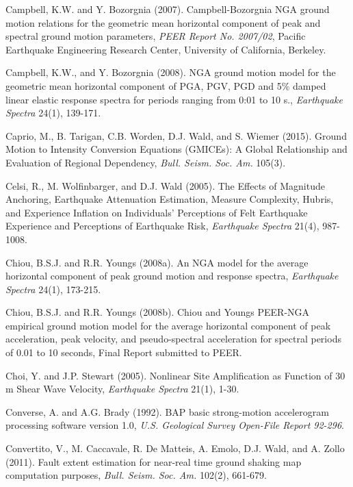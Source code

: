 \documentclass[letterpaper,10pt,english]{sphinxmanual}
\begin{document}
Campbell, K.W. and Y. Bozorgnia (2007). Campbell-Bozorgnia NGA ground motion relations for the
geometric mean horizontal component of peak and spectral ground motion parameters, \emph{PEER Report
No. 2007/02}, Pacific Earthquake Engineering Research Center, University of California, Berkeley.

Campbell, K.W., and Y. Bozorgnia (2008). NGA ground motion model for the geometric mean horizontal
component of PGA, PGV, PGD and 5\% damped linear elastic response spectra for periods ranging from
0:01 to 10 s., \emph{Earthquake Spectra} 24(1), 139-171.

\label{references:caprio2015}
Caprio, M., B. Tarigan, C.B. Worden, D.J. Wald, and S. Wiemer (2015). Ground Motion to Intensity
Conversion Equations (GMICEs): A Global Relationship and Evaluation of Regional Dependency,
\emph{Bull. Seism. Soc. Am.} 105(3).

\label{references:celsi2005}
Celsi, R., M. Wolfinbarger, and D.J. Wald (2005). The Effects of Magnitude Anchoring, Earthquake Attenuation Estimation, Measure Complexity, Hubris, and Experience Inflation on Individuals’ Perceptions of Felt Earthquake Experience and Perceptions of Earthquake Risk, \emph{Earthquake Spectra} 21(4), 987-1008.

Chiou, B.S.J. and R.R. Youngs (2008a). An NGA model for the average horizontal component of peak
ground motion and response spectra, \emph{Earthquake Spectra} 24(1), 173-215.

Chiou, B.S.J. and R.R. Youngs (2008b). Chiou and Youngs PEER-NGA empirical ground motion model
for the average horizontal component of peak acceleration, peak velocity, and pseudo-spectral
acceleration for spectral periods of 0.01 to 10 seconds, Final Report submitted to PEER.

Choi, Y. and J.P. Stewart (2005). Nonlinear Site Amplification as Function of 30 m Shear
Wave Velocity, \emph{Earthquake Spectra} 21(1), 1-30.

\label{references:converse1992}
Converse, A. and A.G. Brady (1992). BAP basic strong-motion accelerogram processing software
version 1.0, \emph{U.S. Geological Survey Open-File Report 92-296}.

\label{references:convertito2011}
Convertito, V., M. Caccavale, R. De Matteis, A. Emolo, D.J. Wald, and A. Zollo (2011). Fault extent
estimation for near-real time ground shaking map computation purposes, \emph{Bull. Seism. Soc. Am.} 102(2), 661-679.
\end{document}
